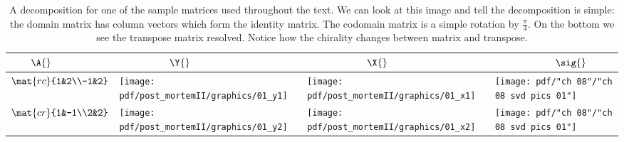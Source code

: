 \begin{landscape}
\thispagestyle{empty}
\begin{table}[htdp]
\begin{center}
\begin{tabular}{m{0.75in}m{1.75in}m{1.75in}m{1.75in}}
  $ \quad \quad \A{}$ & $\qquad \quad \qquad \Y{}$ & $\qquad \qquad \qquad \X{}$ & $\qquad \qquad \qquad \sig{}$ \\ \hline\hline
  $\mat{rc}{1&2\\-1&2}$ \qquad & \qquad 
  \texttt{[image: pdf/post\_mortemII/graphics/01\_y1]} \qquad & \qquad 
  \texttt{[image: pdf/post\_mortemII/graphics/01\_x1]} \qquad & \qquad 
  \texttt{[image: pdf/"ch 08"/"ch 08 svd pics 01"]} \\
  $\mat{cr}{1&-1\\2&2}$ \qquad & \qquad 
  \texttt{[image: pdf/post\_mortemII/graphics/01\_y2]} \qquad & \qquad 
  \texttt{[image: pdf/post\_mortemII/graphics/01\_x2]} \qquad & \qquad 
  \texttt{[image: pdf/"ch 08"/"ch 08 svd pics 01"]} \\
\end{tabular}
\end{center}
\caption[A decomposition for one of the sample matrices]{A decomposition for one of the sample matrices used throughout the text. We can look at this image and tell the decomposition is simple: the domain matrix has column vectors which form the identity matrix. The codomain matrix is a simple rotation by $\frac{\pi}{4}$. On the bottom we see the transpose matrix resolved. Notice how the chirality changes between matrix and transpose.}
\label{tab:pmII:visualsa}
\end{table}%
\end{landscape}
\break
\clearpage
